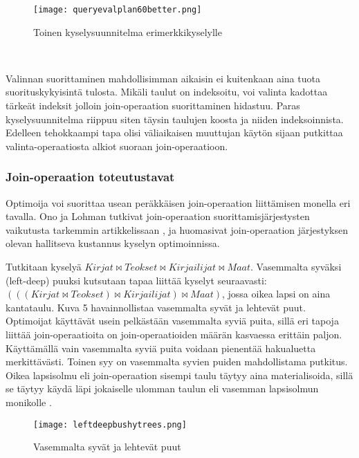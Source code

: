 \documentclass[finnish]{tktltiki2}
\theoremstyle{definition}
\theoremstyle{remark}
\begin{document}
 \begin{figure}[!h] %
  \caption{Toinen kyselysuunnitelma erimerkkikyselylle}
  \centering
    \texttt{[image: queryevalplan60better.png]}
\end{figure}
\\\newline
%

Valinnan suorittaminen mahdollisimman aikaisin ei kuitenkaan aina tuota suorituskykyisintä tulosta. \cite{ramakrishnan2003database} Mikäli taulut on indeksoitu, voi valinta kadottaa tärkeät indeksit jolloin join-operaation suorittaminen hidastuu. Paras kyselysuunnitelma riippuu siten täysin taulujen koosta ja niiden indeksoinnista. Edelleen tehokkaampi tapa olisi väliaikaisen muuttujan käytön sijaan putkittaa valinta-operaatiosta alkiot suoraan join-operaatioon.

\subsubsection{Join-operaation toteutustavat}
Optimoija voi suorittaa usean peräkkäisen join-operaation liittämisen monella eri tavalla. Ono ja Lohman tutkivat join-operaation suorittamisjärjestysten vaikutusta tarkemmin artikkelissaan \cite{ono1990}, ja huomasivat join-operaation järjestyksen olevan hallitseva kustannus kyselyn optimoinnissa. 

Tutkitaan kyselyä $Kirjat \Join Teokset \Join Kirjailijat \Join Maat$. Vasemmalta syväksi (left-deep) puuksi kutsutaan tapaa liittää kyselyt seuraavasti: $(((Kirjat \Join Teokset) \Join Kirjailijat) \Join Maat)$, jossa oikea lapsi on aina kantataulu. Kuva 5 havainnollistaa vasemmalta syvät ja lehtevät puut. Optimoijat käyttävät usein pelkästään vasemmalta syviä puita, sillä eri tapoja liittää join-operaatioita on join-operaatioiden määrän kasvaessa erittäin paljon. Käyttämällä vain vasemmalta syviä puita voidaan pienentää hakualuetta merkittävästi. \cite{left-deeppejä tutkiva artikkeli} Toinen syy on vasemmalta syvien puiden mahdollistama putkitus. Oikea lapsisolmu eli join-operaation sisempi taulu täytyy aina materialisoida, sillä se täytyy käydä läpi jokaiselle ulomman taulun eli vasemman lapsisolmun monikolle \cite{ramakrishnan2003database}. 

\begin{figure}[!h]
  \caption{Vasemmalta syvät ja lehtevät puut}
  \centering
    \texttt{[image: leftdeepbushytrees.png]}
\end{figure}
\end{document}
